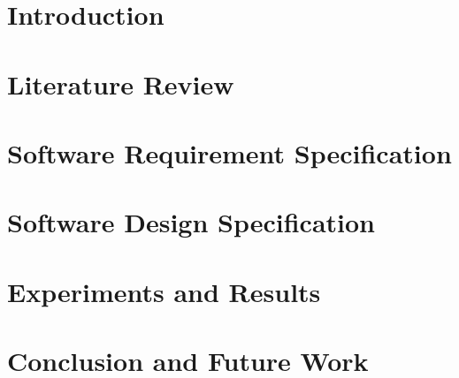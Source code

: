 \documentclass[12pt,twosided]{report}
\begin{document}
%

\chapter{Introduction}
\label{chap:intro}


\chapter{Literature Review}
\label{chap:lit}


\chapter{Software Requirement Specification}
\label{chap:srs}


\chapter{Software Design Specification}
\label{chap:sds}


\chapter{Experiments and Results}
\label{chap:results}


\chapter{Conclusion and Future Work}
\label{chap:outro}

\end{document}
